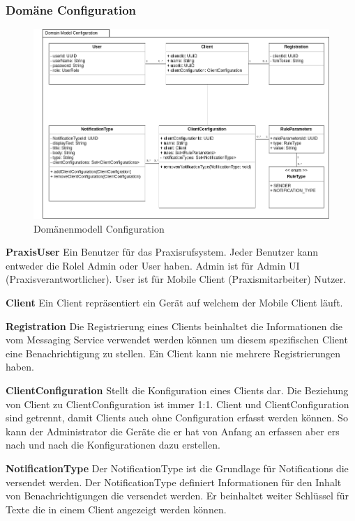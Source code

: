 \subsubsection*{Domäne Configuration}

\begin{figure}[h]
    \centering
    \begin{minipage}[b]{0.9\textwidth}
        \includegraphics[width=\textwidth]{graphics/Class_Configuration_Domain}
        \caption{Domänenmodell Configuration}
    \end{minipage}
\end{figure}

\textbf{PraxisUser}
Ein Benutzer für das Praxisrufsystem.
Jeder Benutzer kann entweder die Rolel Admin oder User haben.
Admin ist für Admin UI (Praxisverantwortlicher).
User ist für Mobile Client (Praxismitarbeiter) Nutzer.

\textbf{Client}
Ein Client repräsentiert ein Gerät auf welchem der Mobile Client läuft.

\textbf{Registration}
Die Registrierung eines Clients beinhaltet die Informationen die vom Messaging Service verwendet werden können um diesem spezifischen Client eine Benachrichtigung zu stellen.
Ein Client kann nie mehrere Registrierungen haben.

\textbf{ClientConfiguration}
Stellt die Konfiguration eines Clients dar.
Die Beziehung von Client zu ClientConfiguration ist immer 1:1.
Client und ClientConfiguration sind getrennt, damit Clients auch ohne Configuration erfasst werden können.
So kann der Administrator die Geräte die er hat von Anfang an erfassen aber ers nach und nach die Konfigurationen dazu erstellen.

\textbf{NotificationType}
Der NotificationType ist die Grundlage für Notifications die versendet werden.
Der NotificationType definiert Informationen für den Inhalt von Benachrichtigungen die versendet werden.
Er beinhaltet weiter Schlüssel für Texte die in einem Client angezeigt werden können.

